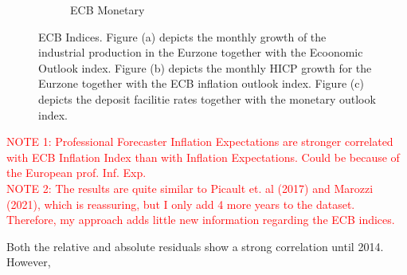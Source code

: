 \documentclass[review]{elsarticle}
\begin{document}
\begin{figure}[h!]
\begin{subfigure}{6cm}
    \caption{ECB Monetary}
    \label{ECB_inf}
\end{subfigure}
\caption{ECB Indices. Figure (a) depicts the monthly growth of the industrial production in the Eurzone together with the Ecoonomic Outlook index. Figure (b) depicts the monthly HICP growth for the Eurzone together with the ECB inflation outlook index. Figure (c) depicts the deposit facilitie rates together with the monetary outlook index.}
\label{fig:ECB Index}
    \end{figure}
\newpage
\textcolor{red}{NOTE 1: Professional Forecaster Inflation Expectations are stronger correlated with ECB Inflation Index than with Inflation Expectations. Could be because of the European prof. Inf. Exp.}
\\
\textcolor{red}{NOTE 2: The results are quite similar to Picault et. al (2017) and Marozzi (2021), which is reassuring, but I only add 4 more years to the dataset. Therefore, my approach adds little new information regarding the ECB indices.}

Both the relative and absolute residuals show a strong correlation until 2014. However,  



\newpage
\end{document}
